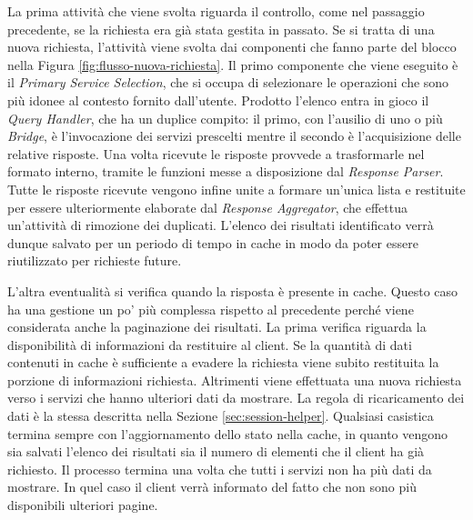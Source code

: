 La prima attività che viene svolta riguarda il controllo, come nel passaggio precedente, se la richiesta era già stata gestita in passato. Se si tratta di una nuova richiesta, l'attività viene svolta dai componenti che fanno parte del blocco  nella Figura \ref{fig:flusso-nuova-richiesta}. Il primo componente che viene eseguito è il \emph{Primary Service Selection}, che si occupa di selezionare le operazioni che sono più idonee al contesto fornito dall'utente. Prodotto l'elenco entra in gioco il \emph{Query Handler}, che ha un duplice compito: il primo, con l'ausilio di uno o più \emph{Bridge}, è l'invocazione dei servizi prescelti mentre il secondo è l'acquisizione delle relative risposte. Una volta ricevute le risposte provvede a trasformarle nel formato interno, tramite le funzioni messe a disposizione dal \emph{Response Parser}. Tutte le risposte ricevute vengono infine unite a formare un'unica lista e restituite per essere ulteriormente elaborate dal \emph{Response Aggregator}, che effettua un'attività di rimozione dei duplicati. L'elenco dei risultati identificato verrà dunque salvato per un periodo di tempo in cache in modo da poter essere riutilizzato per richieste future.

L'altra eventualità si verifica quando la risposta è presente in cache. Questo caso ha una gestione un po' più complessa rispetto al precedente perché viene considerata anche la paginazione dei risultati. La prima verifica riguarda la disponibilità di informazioni da restituire al client. Se la quantità di dati contenuti in cache è sufficiente a evadere la richiesta viene subito restituita la porzione di informazioni richiesta. Altrimenti viene effettuata una nuova richiesta verso i servizi che hanno ulteriori dati da mostrare. La regola di ricaricamento dei dati è la stessa descritta nella Sezione \ref{sec:session-helper}. Qualsiasi casistica termina sempre con l'aggiornamento dello stato nella cache, in quanto vengono sia salvati l'elenco dei risultati sia il numero di elementi che il client ha già richiesto. Il processo termina una volta che tutti i servizi non ha più dati da mostrare. In quel caso il client verrà informato del fatto che non sono più disponibili ulteriori pagine.

